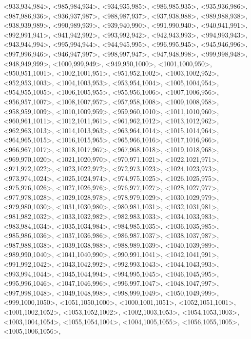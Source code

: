 \documentclass[a4paper,10pt]{article}
\begin{document}
\begin{eulernotebook}
\begin{euleroutput}
  <933,934,984>,
  <985,984,934>,
  <934,935,985>,
  <986,985,935>,
  <935,936,986>,
  <987,986,936>,
  <936,937,987>,
  <988,987,937>,
  <937,938,988>,
  <989,988,938>,
  <938,939,989>,
  <990,989,939>,
  <939,940,990>,
  <991,990,940>,
  <940,941,991>,
  <992,991,941>,
  <941,942,992>,
  <993,992,942>,
  <942,943,993>,
  <994,993,943>,
  <943,944,994>,
  <995,994,944>,
  <944,945,995>,
  <996,995,945>,
  <945,946,996>,
  <997,996,946>,
  <946,947,997>,
  <998,997,947>,
  <947,948,998>,
  <999,998,948>,
  <948,949,999>,
  <1000,999,949>,
  <949,950,1000>,
  <1001,1000,950>,
  <950,951,1001>,
  <1002,1001,951>,
  <951,952,1002>,
  <1003,1002,952>,
  <952,953,1003>,
  <1004,1003,953>,
  <953,954,1004>,
  <1005,1004,954>,
  <954,955,1005>,
  <1006,1005,955>,
  <955,956,1006>,
  <1007,1006,956>,
  <956,957,1007>,
  <1008,1007,957>,
  <957,958,1008>,
  <1009,1008,958>,
  <958,959,1009>,
  <1010,1009,959>,
  <959,960,1010>,
  <1011,1010,960>,
  <960,961,1011>,
  <1012,1011,961>,
  <961,962,1012>,
  <1013,1012,962>,
  <962,963,1013>,
  <1014,1013,963>,
  <963,964,1014>,
  <1015,1014,964>,
  <964,965,1015>,
  <1016,1015,965>,
  <965,966,1016>,
  <1017,1016,966>,
  <966,967,1017>,
  <1018,1017,967>,
  <967,968,1018>,
  <1019,1018,968>,
  <969,970,1020>,
  <1021,1020,970>,
  <970,971,1021>,
  <1022,1021,971>,
  <971,972,1022>,
  <1023,1022,972>,
  <972,973,1023>,
  <1024,1023,973>,
  <973,974,1024>,
  <1025,1024,974>,
  <974,975,1025>,
  <1026,1025,975>,
  <975,976,1026>,
  <1027,1026,976>,
  <976,977,1027>,
  <1028,1027,977>,
  <977,978,1028>,
  <1029,1028,978>,
  <978,979,1029>,
  <1030,1029,979>,
  <979,980,1030>,
  <1031,1030,980>,
  <980,981,1031>,
  <1032,1031,981>,
  <981,982,1032>,
  <1033,1032,982>,
  <982,983,1033>,
  <1034,1033,983>,
  <983,984,1034>,
  <1035,1034,984>,
  <984,985,1035>,
  <1036,1035,985>,
  <985,986,1036>,
  <1037,1036,986>,
  <986,987,1037>,
  <1038,1037,987>,
  <987,988,1038>,
  <1039,1038,988>,
  <988,989,1039>,
  <1040,1039,989>,
  <989,990,1040>,
  <1041,1040,990>,
  <990,991,1041>,
  <1042,1041,991>,
  <991,992,1042>,
  <1043,1042,992>,
  <992,993,1043>,
  <1044,1043,993>,
  <993,994,1044>,
  <1045,1044,994>,
  <994,995,1045>,
  <1046,1045,995>,
  <995,996,1046>,
  <1047,1046,996>,
  <996,997,1047>,
  <1048,1047,997>,
  <997,998,1048>,
  <1049,1048,998>,
  <998,999,1049>,
  <1050,1049,999>,
  <999,1000,1050>,
  <1051,1050,1000>,
  <1000,1001,1051>,
  <1052,1051,1001>,
  <1001,1002,1052>,
  <1053,1052,1002>,
  <1002,1003,1053>,
  <1054,1053,1003>,
  <1003,1004,1054>,
  <1055,1054,1004>,
  <1004,1005,1055>,
  <1056,1055,1005>,
  <1005,1006,1056>,

\end{euleroutput}
\end{eulernotebook}
\end{document}
